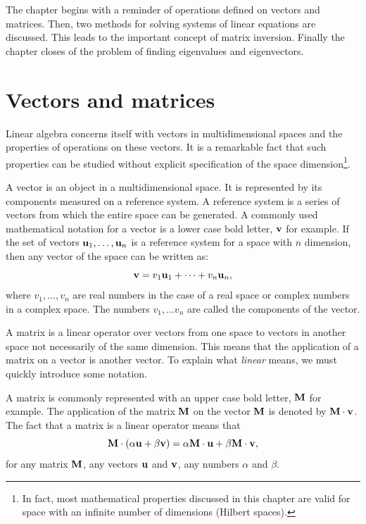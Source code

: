 \documentclass[twoside]{book}
\begin{document}
The chapter begins with a reminder of operations defined on
vectors and matrices. Then, two methods for solving systems of
linear equations are discussed. This leads to the important
concept of matrix inversion. Finally the chapter closes of the
problem of finding eigenvalues and eigenvectors.

\section{Vectors and matrices}
\label{sec:linearalgebra} Linear algebra concerns itself with
vectors in multidimensional spaces and the properties of
operations on these vectors. It is a remarkable fact that such
properties can be studied without explicit specification of the
space dimension\footnote{In fact, most mathematical properties
discussed in this chapter are valid for space with an infinite
number of dimensions (Hilbert spaces).}.

A vector is an object in a multidimensional space. It is
represented by its components measured on a reference system. A
reference system is a series of vectors from which the entire
space can be generated. A commonly used mathematical notation for
a vector is a lower case bold letter, ${\bf v}$ for example. If
the set of vectors ${\bf u}_1,\ldots,{\bf u}_n$ is a reference
system for a space with $n$ dimension, then any vector of the
space can be written as:
\begin{equation}
\label{eq:vectordef}
  {\bf v} = v_1{\bf u}_1+\cdots+v_n{\bf u}_n,
\end{equation}
where $v_1,\ldots,v_n$ are real numbers in the case of a real
space or complex numbers in a complex space. The numbers
$v_1,\ldots v_n$ are called the components of the vector.

A matrix is a linear operator over vectors from one space to
vectors in another space not necessarily of the same dimension.
This means that the application of a matrix on a vector is another
vector. To explain what {\sl linear} means, we must quickly
introduce some notation.

A matrix is commonly represented with an upper case bold letter,
${\bf M}$ for example. The application of the matrix ${\bf M}$ on
the vector ${\bf M}$ is denoted by ${\bf M}\cdot{\bf v}$. The fact
that a matrix is a linear operator means that
\begin{equation}
{\bf M}\cdot\left(\alpha{\bf u}+\beta{\bf v}\right)=\alpha{\bf
M}\cdot{\bf u}+\beta{\bf M}\cdot{\bf v},
\end{equation}
for any matrix ${\bf M}$, any vectors ${\bf u}$ and ${\bf v}$, any
numbers $\alpha$ and $\beta$.
\end{document}
